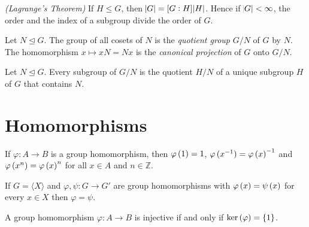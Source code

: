 \vspace{2mm}

\begin{proposition}\emph{(Lagrange's Theorem)}
	If $H \leq G$, then $\abs{G} = \intcc{G : H}\abs{H}$. Hence if $\abs{G} < \infty$, the order and the index of a subgroup divide the order of $G$.
\end{proposition}

\vspace{2mm}

\begin{definition}
	Let $N \unlhd G$. The group of all cosets of $N$ is the \emph{quotient group} $G/N$ of $G$ by $N$. The homomorphism $x \mapsto xN = Nx$ is the \emph{canonical projection} of $G$ onto $G/N$.
\end{definition}

\vspace{2mm}

\begin{proposition}
	Let $N \unlhd G$. Every subgroup of $G/N$ is the quotient $H/N$ of a unique subgroup $H$ of $G$ that contains $N$.
\end{proposition}


\section{Homomorphisms}

\begin{proposition}
	If $\varphi: A \to B$ is a group homomorphism, then $\varphi\del{1} = 1$, $\varphi\del[0]{x^{-1}} = \varphi\del{x}^{-1}$ and $\varphi\del[0]{x^n} = \varphi\del{x}^n$ for all $x \in A$ and $n \in \mathbb{Z}$.
\end{proposition}

\vspace{2mm}

\begin{proposition}
	If $G = \langle X \rangle$ and $\varphi, \psi: G \to G'$ are group homomorphisms with $\varphi\del{x} = \psi\del{x}$ for every $x \in X$ then $\varphi = \psi$. 
\end{proposition}

\vspace{2mm}

\begin{proposition}
	A group homomorphism $\varphi: A \to B$ is injective if and only if $\ker\del{\varphi} = \cbr{1}$.
\end{proposition}



